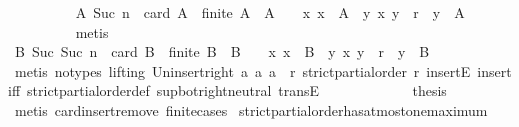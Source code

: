 \begin{isabellebody}
\ \ \ \ \ \ \ \ \isamarkupfalse%
\ {\isacartoucheopen}{\isasymforall}A{\isachardot}\ Suc\ n\ {\isacharequal}\ card\ A\ {\isasymlongrightarrow}\ finite\ A\ {\isasymlongrightarrow}\ A\ {\isasymnoteq}\ {\isasymemptyset}\ {\isasymlongrightarrow}\ {\isacharparenleft}{\isasymexists}x{\isachardot}\ x\ {\isasymin}\ A\ {\isasymand}\ {\isacharparenleft}{\isasymforall}y{\isachardot}\ {\isacharparenleft}x{\isacharcomma}\ y{\isacharparenright}\ {\isasymin}\ r\ {\isasymlongrightarrow}\ y\ {\isasymnotin}\ A{\isacharparenright}{\isacharparenright}{\isacartoucheclose}\ \isanewline
\ \ \ \ \ \ \ \ \isamarkupfalse%
\ metis\isanewline
\ \ \ \ \ \ \isamarkupfalse%
\ \isamarkupfalse%
\ {\isachardoublequoteopen}{\isasymforall}B{\isachardot}\ Suc\ {\isacharparenleft}Suc\ n{\isacharparenright}\ {\isacharequal}\ card\ B\ {\isasymlongrightarrow}\ finite\ B\ {\isasymlongrightarrow}\ B\ {\isasymnoteq}\ {\isasymemptyset}\ {\isasymlongrightarrow}\ {\isacharparenleft}{\isasymexists}x{\isachardot}\ x\ {\isasymin}\ B\ {\isasymand}\ {\isacharparenleft}{\isasymforall}y{\isachardot}\ {\isacharparenleft}x{\isacharcomma}\ y{\isacharparenright}\ {\isasymin}\ r\ {\isasymlongrightarrow}\ y\ {\isasymnotin}\ B{\isacharparenright}{\isacharparenright}{\isachardoublequoteclose}\isanewline
\ \ \ \ \ \ \ \ \isamarkupfalse%
\ {\isacharparenleft}metis\ {\isacharparenleft}no{\isacharunderscore}types{\isacharcomma}\ lifting{\isacharparenright}\ Un{\isacharunderscore}insert{\isacharunderscore}right\ {\isacartoucheopen}{\isasymforall}a{\isachardot}\ {\isacharparenleft}a{\isacharcomma}\ a{\isacharparenright}\ {\isasymnotin}\ r{\isacartoucheclose}\ {\isacartoucheopen}strict{\isacharunderscore}partial{\isacharunderscore}order\ r{\isacartoucheclose}\ insertE\ insert{\isacharunderscore}iff\ strict{\isacharunderscore}partial{\isacharunderscore}order{\isacharunderscore}def\ sup{\isacharunderscore}bot{\isachardot}right{\isacharunderscore}neutral\ transE{\isacharparenright}\isanewline
\ \ \ \ \isamarkupfalse%
\isanewline
\ \ \isamarkupfalse%
\isanewline
\ \ \isamarkupfalse%
\ \isamarkupfalse%
\ {\isacharquery}thesis\isanewline
\ \ \ \ \isamarkupfalse%
\ {\isacharparenleft}metis\ card{\isachardot}insert{\isacharunderscore}remove\ finite{\isachardot}cases{\isacharparenright}\isanewline
{}\isamarkupfalse%
%
\endisatagproof
{\isafoldproof}%
%
\isadelimproof
\isanewline
%
\endisadelimproof
\isanewline
{}\isamarkupfalse%
\ strict{\isacharunderscore}partial{\isacharunderscore}order{\isacharunderscore}has{\isacharunderscore}at{\isacharunderscore}most{\isacharunderscore}one{\isacharunderscore}maximum\ {\isacharcolon}\isanewline

\end{isabellebody}
